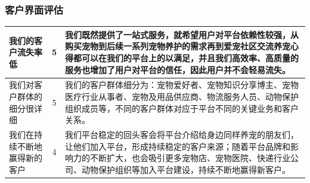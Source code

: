 \documentclass[a4paper]{ctexart}
\begin{document}
\subsubsection{客户界面评估}
\begin{table}[h]
  \centering
\begin{tabular}{|p{3.5cm}|c|p{10cm}|}
  \hline
  我们的客户流失率低 & 5 & 我们既然提供了一站式服务，就希望用户对平台依赖性较强，从购买宠物到后续一系列宠物养护的需求再到爱宠社区交流养宠心得都可以在我们的平台上的以满足，并且我们高效率、高质量的服务也增加了用户对平台的信任，因此用户并不会轻易流失。\\
  \hline
  我们对客户群体的细分很详细 & 5 & 我们的客户群体细分为：宠物爱好者、宠物知识分享博主、宠物医疗行业从事者、宠物及用品供应商、物流服务人员、动物保护组织成员等，不同的客户群体对应于平台不同的关键业务和客户关系。\\
  \hline
  我们在持续不断地赢得新的客户 & 4 & 我们平台稳定的回头客会将平台介绍给身边同样养宠的朋友们，让他们加入平台，形成持续稳定的客户来源；随着平台品牌和影响力的不断扩大，也会吸引更多宠物店、宠物医院、快递行业公司、动物保护组织等加入平台建设，持续不断地赢得新客户。\\
  \hline
\end{tabular}
\end{table}
\end{document}
